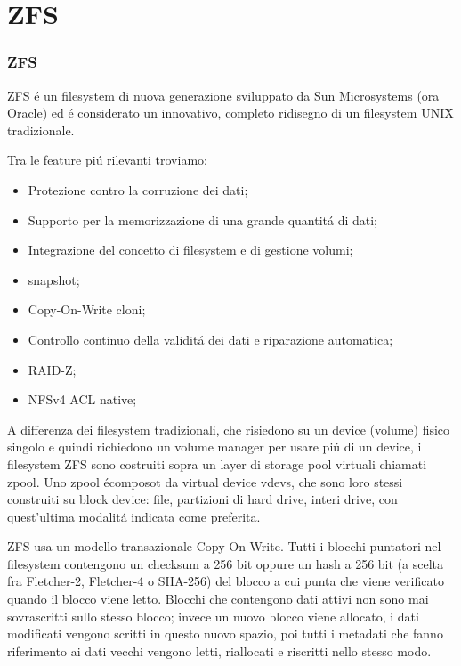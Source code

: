 \documentclass{beamer}
\begin{document}
\section{ZFS}
\begin{frame}
\frametitle{ZFS}
ZFS \'e un filesystem di nuova generazione sviluppato da Sun Microsystems (ora Oracle) ed \'e considerato un innovativo, completo ridisegno di un filesystem UNIX tradizionale. 
\end{frame}

\begin{frame}
Tra le feature pi\'u rilevanti troviamo:
\begin{itemize}
\item Protezione contro la corruzione dei dati;
\item Supporto per la memorizzazione di una grande quantit\'a di dati;
\item Integrazione del concetto di filesystem e di gestione volumi;
\item snapshot;
\item Copy-On-Write cloni;
\item Controllo continuo della validit\'a dei dati e riparazione automatica;
\item RAID-Z;
\item NFSv4 ACL native;
\end{itemize}
\end{frame}

\begin{frame}
A differenza dei filesystem tradizionali, che risiedono su un device (volume) fisico singolo e quindi richiedono un volume manager per usare pi\'u di un device, i filesystem ZFS sono costruiti sopra un layer di storage pool virtuali chiamati zpool. 
\newline
Uno zpool \'ecomposot da virtual device vdevs, che sono loro stessi construiti su block device: file, partizioni di hard drive, interi drive, con quest'ultima modalit\'a indicata come preferita.
\end{frame}

\begin{frame}
ZFS usa un modello transazionale Copy-On-Write. Tutti i blocchi puntatori nel filesystem contengono un checksum a 256 bit oppure un hash a 256 bit (a scelta fra Fletcher-2, Fletcher-4 o SHA-256) del blocco a cui punta che viene verificato quando il blocco viene letto. Blocchi che contengono dati attivi non sono mai sovrascritti sullo stesso blocco; invece un nuovo blocco viene allocato, i dati modificati vengono scritti in questo nuovo spazio, poi tutti i metadati che fanno riferimento ai dati vecchi vengono letti, riallocati e riscritti nello stesso modo. 
\end{frame}
\end{document}
